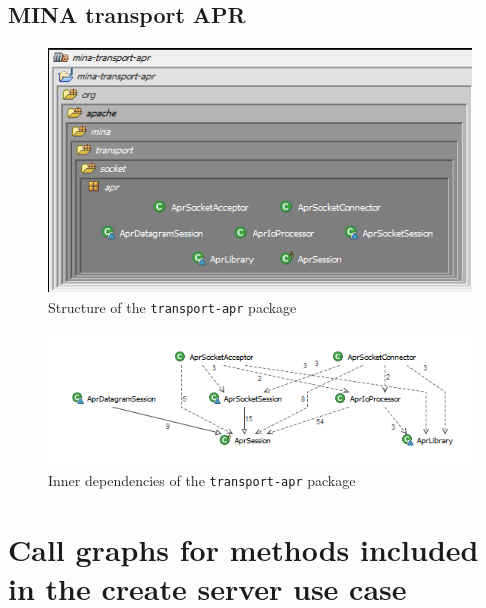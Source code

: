 \subsection{MINA transport APR}

\begin{figure}[H]
    \centering
    \includegraphics{images/MINA_apr_structure.png}
    \caption{Structure of the \texttt{transport-apr} package}
    \label{fig:apr_structure}
\end{figure}

\begin{figure}[H]
    \centering
    \includegraphics[width=\textwidth]{images/MINA_apr_dependencies.png}
    \caption{Inner dependencies of the \texttt{transport-apr} package}
    \label{fig:apr_dependencies}
\end{figure}

\section{Call graphs for methods included in the create server use case}
\label{sec:call_graphs}

